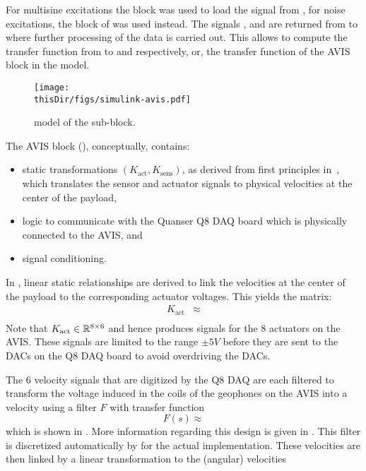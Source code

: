 For multisine excitations the  block was used to load the  signal from \MATLAB, for noise excitations, the  block of \Simulink was used instead.
The signals ,  and  are returned from \Simulink to \MATLAB where further processing of the data is carried out.
This allows to compute the transfer function from  to  and  respectively, or, the transfer function of the \gls{AVIS} block in the \Simulink model.

\begin{figure}[p]
\setlength\figurewidth{\columnwidth}
  \texttt{[image: \\thisDir/figs/simulink-avis.pdf]}
  \caption{\Simulink model of the  sub-block.}
  \label{fig:avis:simulink:avis}
\end{figure}

The \gls{AVIS} block (), conceptually, contains:
\begin{itemize}
  \item static transformations $(K_{\mathrm{act}}, K_{\mathrm{sens}})$, as derived from first principles in~\citep{Rademakers2005MSc}, which translates the sensor and actuator signals to physical velocities at the center of the payload,
  \item logic to communicate with the Quanser Q8 \gls{DAQ} board which is physically connected to the \gls{AVIS}, and
  \item signal conditioning.
\end{itemize}

In \citet[Appendix A.4]{Rademakers2005MSc}, linear static relationships are derived to link the velocities at the center of the payload to the corresponding actuator voltages.
This yields the matrix:
\begin{align}
  K_{\mathrm{act}}    & \approx \\
\end{align}
Note that $K_{\mathrm{act}} \in \mathbb{R}^{8\times6}$ and hence produces signals for the $8$ actuators on the \gls{AVIS}.
These signals are limited to the range $\pm 5\unit{V}$ before they are sent to the \glspl{DAC} on the Q8 \gls{DAQ} board to avoid overdriving the \glspl{DAC}.

The $6$ velocity signals that are digitized by the Q8 \gls{DAQ} are each filtered to transform the voltage induced in the coils of the geophones on the \gls{AVIS} into a velocity using a filter $F$ with transfer function
\begin{equation}
  F(s) \approx 
\end{equation}
which is shown in .
More information regarding this design is given in \citep[Appendix A.3]{Rademakers2005MSc}.
This filter is discretized automatically by \Simulink for the actual implementation.
These velocities are then linked by a linear transformation to the (angular) velocities

